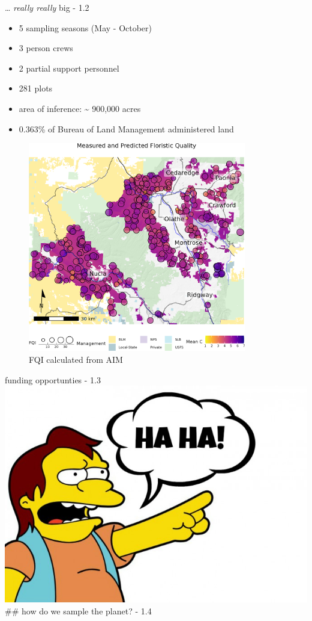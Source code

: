\documentclass[
  ignorenonframetext,
]{beamer}
\providecommand{\tightlist}{%
  \setlength{\itemsep}{0pt}\setlength{\parskip}{0pt}}
\begin{document}
\begin{frame}{\ldots{} \emph{really really} big - 1.2}
\protect\hypertarget{really-really-big---1.2}{}
\begin{itemize}
\tightlist
\item
  5 sampling seasons (May - October)
\item
  3 person crews
\item
  2 partial support personnel
\item
  281 plots
\item
  area of inference: \textasciitilde{} 900,000 acres
\item
  0.363\% of Bureau of Land Management administered land
\end{itemize}

\begin{figure}
\centering
\includegraphics[width=0.85\textwidth,height=\textheight]{../graphics/assorted/FQI.png}
\caption{FQI calculated from AIM}
\end{figure}
\end{frame}

\begin{frame}{funding opportunties - 1.3}
\protect\hypertarget{funding-opportunties---1.3}{}
\includegraphics{../graphics/pictures/Nelson.jpg} \#\# how do we sample
the planet? - 1.4
\end{frame}
\end{document}
